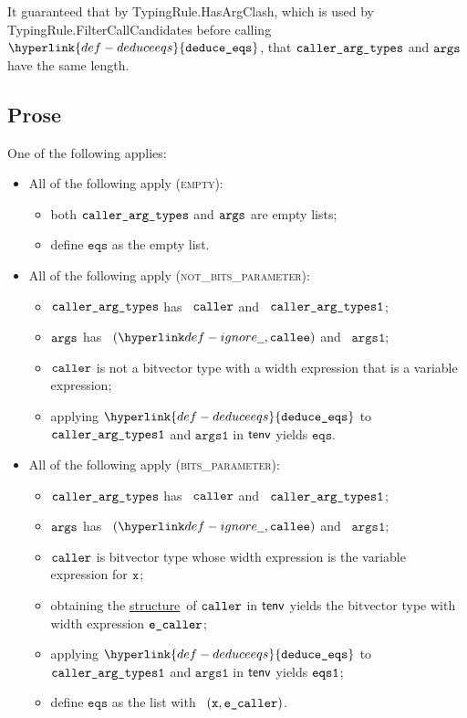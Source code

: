 \documentclass{book}
\newcommand\ProseOrTypeError[0]{\ProseTerminateAs{\TypeErrorConfig}}
\newcommand\structure[0]{\hyperlink{def-structure}{structure}}
\newcommand\deduceeqs[0]{\hyperlink{def-deduceeqs}{\texttt{deduce\_eqs}}}
\newcommand\eqs[0]{\texttt{eqs}}
\newcommand\vargsone[0]{\texttt{args1}}
\begin{document}
It guaranteed that by TypingRule.HasArgClash,
which is used by \\ TypingRule.FilterCallCandidates before calling $\deduceeqs$,
that $\texttt{caller\_arg\_types}$ and $\texttt{args}$ have the same length.

\subsection{Prose}
One of the following applies:
\begin{itemize}
  \item All of the following apply (\textsc{empty}):
  \begin{itemize}
    \item both $\texttt{caller\_arg\_types}$ and $\texttt{args}$ are empty lists;
    \item define $\eqs$ as the empty list.
  \end{itemize}

  \item All of the following apply (\textsc{not\_bits\_parameter}):
  \begin{itemize}
    \item $\texttt{caller\_arg\_types}$ has \head\ $\texttt{caller}$ and \tail\ $\texttt{caller\_arg\_types1}$;
    \item $\texttt{args}$ has \head\ $(\Ignore, \callee)$ and \tail\ $\vargsone$;
    \item $\texttt{caller}$ is not a bitvector type with a width expression that is a variable expression;
    \item applying $\deduceeqs$ to $\texttt{caller\_arg\_types1}$ and $\vargsone$ in $\textsf{tenv}$ yields $\eqs$.
  \end{itemize}

  \item All of the following apply (\textsc{bits\_parameter}):
  \begin{itemize}
    \item $\texttt{caller\_arg\_types}$ has \head\ $\texttt{caller}$ and \tail\ $\texttt{caller\_arg\_types1}$;
    \item $\texttt{args}$ has \head\ $(\Ignore, \callee)$ and \tail\ $\vargsone$;
    \item $\texttt{caller}$ is bitvector type whose width expression is the variable expression for $\texttt{x}$;
    \item obtaining the \structure\ of $\texttt{caller}$ in $\textsf{tenv}$ yields the bitvector type with width expression $\texttt{e\_caller}$\ProseOrTypeError;
    \item applying $\deduceeqs$ to $\texttt{caller\_arg\_types1}$ and $\vargsone$ in $\textsf{tenv}$ yields $\texttt{eqs1}$;
    \item define $\eqs$ as the list with \head\ $(\texttt{x}, \texttt{e\_caller})$.
  \end{itemize}
\end{itemize}
\end{document}

